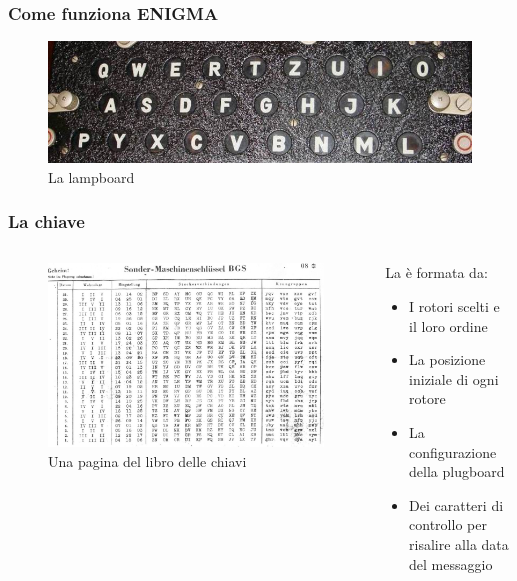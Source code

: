 	
	\begin{frame}
		\frametitle{Come funziona ENIGMA}
		\begin{figure}[h]
			\centering
			\includegraphics[scale=0.5]{img/lampboard}
			\caption{La lampboard}
			\label{fig:lampboard}
		\end{figure}
	\end{frame}

	\begin{frame}
		\frametitle{La chiave}
		\begin{columns}
			\begin{column}{0.5\textwidth}
				\begin{center}
					\begin{figure}
						\includegraphics[width=\columnwidth]{img/enigmakeylist}
						\caption{Una pagina del libro delle chiavi}
					\end{figure}
				\end{center}
			\end{column}
			\begin{column}{0.5\textwidth}
				La  è formata da:
				\begin{itemize}
					\item I rotori scelti e il loro ordine
					\item La posizione iniziale di ogni rotore
					\item La configurazione della plugboard
					\item Dei caratteri di controllo per risalire alla data del messaggio
				\end{itemize}
			\end{column}
		\end{columns}
	\end{frame}
	

